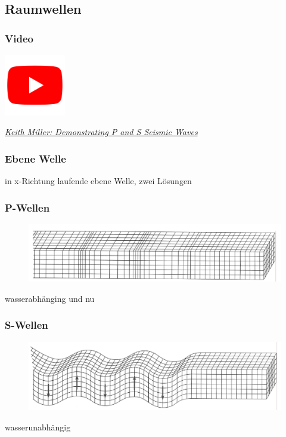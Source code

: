 \subsection{Raumwellen}

\begin{frame}
\frametitle{Video}
\begin{center}
\includegraphics[width=0.2\textwidth]{fig_img/youtube.png}   
\end{center}


\href{https://www.youtube.com/watch?v=gjRGIpP-Qfw}{\textsl{Keith Miller: Demonstrating P and S Seismic Waves}}

\end{frame}


\begin{frame}
\frametitle{Ebene Welle}
in x-Richtung laufende ebene Welle, zwei Lösungen
\end{frame}


\begin{frame}
\frametitle{P-Wellen}
\begin{figure}
\includegraphics[width=\textwidth]{fig_img/p_wave} 
\caption*{\cite{Vrettos2017}}
\end{figure}
wasserabhänging und nu
\end{frame}


\begin{frame}
\frametitle{S-Wellen}
\begin{figure}
\includegraphics[width=\textwidth]{fig_img/s_wave} 
\caption*{\cite{Vrettos2017}}
\end{figure}
wasserunabhängig
\end{frame}


